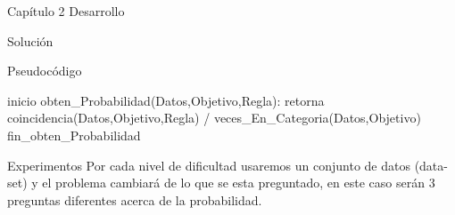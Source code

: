 \documentclass[
  spanish,
  ignorenonframetext,
]{beamer}
\newenvironment{Shaded}{}{}
\newcommand{\NormalTok}[1]{#1}
\newcommand{\OperatorTok}[1]{\textcolor[rgb]{0.40,0.40,0.40}{#1}}
\begin{document}
\begin{frame}{Capítulo 2 Desarrollo}
\begin{block}{Solución}
\begin{block}{Pseudocódigo}
\begin{Shaded}
\begin{Highlighting}[]
\NormalTok{inicio obten\_Probabilidad(Datos,Objetivo,Regla):}
\NormalTok{    retorna coincidencia(Datos,Objetivo,Regla) }\OperatorTok{/}\NormalTok{ veces\_En\_Categoria(Datos,Objetivo)}
\NormalTok{fin\_obten\_Probabilidad}
\end{Highlighting}
\end{Shaded}
\end{block}
\end{block}

\begin{block}{Experimentos}
\protect\hypertarget{experimentos}{}
Por cada nivel de dificultad usaremos un conjunto de datos (data-set) y
el problema cambiará de lo que se esta preguntado, en este caso serán 3
preguntas diferentes acerca de la probabilidad.
\end{block}
\end{frame}
\end{document}
